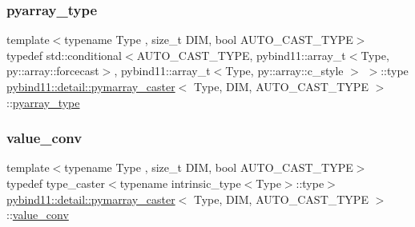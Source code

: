\mbox{\label{structpybind11_1_1detail_1_1pymarray__caster_a70ad611a7f6fd17d02b461c43dff6ea0}} 
\subsubsection{\texorpdfstring{pyarray\+\_\+type}{pyarray\_type}}
{\footnotesize\ttfamily template$<$typename Type , size\+\_\+t D\+IM, bool A\+U\+T\+O\+\_\+\+C\+A\+S\+T\+\_\+\+T\+Y\+PE$>$ \\
typedef std\+::conditional$<$A\+U\+T\+O\+\_\+\+C\+A\+S\+T\+\_\+\+T\+Y\+PE, pybind11\+::array\+\_\+t$<$Type, py\+::array\+::forcecast$>$, pybind11\+::array\+\_\+t$<$Type, py\+::array\+::c\+\_\+style $>$ $>$\+::type \hyperlink{structpybind11_1_1detail_1_1pymarray__caster}{pybind11\+::detail\+::pymarray\+\_\+caster}$<$ Type, D\+IM, A\+U\+T\+O\+\_\+\+C\+A\+S\+T\+\_\+\+T\+Y\+PE $>$\+::\hyperlink{structpybind11_1_1detail_1_1pymarray__caster_a70ad611a7f6fd17d02b461c43dff6ea0}{pyarray\+\_\+type}}

\mbox{\label{structpybind11_1_1detail_1_1pymarray__caster_aa57421c8e7e64ab62bac67897f864ea1}} 
\subsubsection{\texorpdfstring{value\+\_\+conv}{value\_conv}}
{\footnotesize\ttfamily template$<$typename Type , size\+\_\+t D\+IM, bool A\+U\+T\+O\+\_\+\+C\+A\+S\+T\+\_\+\+T\+Y\+PE$>$ \\
typedef type\+\_\+caster$<$typename intrinsic\+\_\+type$<$Type$>$\+::type$>$ \hyperlink{structpybind11_1_1detail_1_1pymarray__caster}{pybind11\+::detail\+::pymarray\+\_\+caster}$<$ Type, D\+IM, A\+U\+T\+O\+\_\+\+C\+A\+S\+T\+\_\+\+T\+Y\+PE $>$\+::\hyperlink{structpybind11_1_1detail_1_1pymarray__caster_aa57421c8e7e64ab62bac67897f864ea1}{value\+\_\+conv}}

